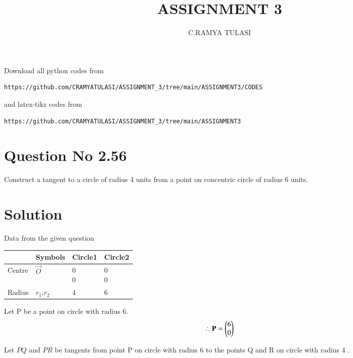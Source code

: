 \documentclass[journal,12pt,twocolumn]{IEEEtran}
\begin{document}
     \def\rightbox#1{\makebox[0in][r]{#1}}
     \def\centbox#1{\makebox[0in]{#1}}
     \def\topbox#1{\raisebox{-\baselineskip}[0in][0in]{#1}}
     \def\midbox#1{\raisebox{-0.5\baselineskip}[0in][0in]{#1}}
\vspace{3cm}
\title{ASSIGNMENT 3}
\author{C.RAMYA TULASI}
\maketitle
\newpage
\bigskip
\renewcommand{\thefigure}{\theenumi}
\renewcommand{\thetable}{\theenumi}
Download all python codes from 
\begin{lstlisting}
https://github.com/CRAMYATULASI/ASSIGNMENT_3/tree/main/ASSIGNMENT3/CODES
\end{lstlisting}
%
and latex-tikz codes from 
%
\begin{lstlisting}
https://github.com/CRAMYATULASI/ASSIGNMENT_3/tree/main/ASSIGNMENT3
\end{lstlisting}
%
\section{Question No 2.56}
Construct a tangent to a circle of radius 4 units from a point on concentric circle of radius 6 units.
%
\section{Solution}
Data from the given question 
\begin{table}[!ht]
\begin{center}
\begin{tabular}{ | m{2cm} | m{1.5cm}| m{2cm} | m{1.5cm} |} 
\hline
& Symbols & Circle1 & Circle2 \\
\hline
Centre & $\vec{O}$ & \myvec{0\\0} & \myvec{0\\0} \\ 
\hline
Radius & $r_{1}$,$r_{2}$ & 4 & 6\\ 
\hline
\end{tabular}
\end{center}
\end{table}

 Let P be a point on circle with radius 6.
\begin{align}
 \therefore \mathbf{P} = \begin{pmatrix}6\\0\end{pmatrix}
\end{align}

Let $PQ$ and $PR$  be tangents from point P on circle with radius 6 to the points Q and R on circle with radius 4 .
\end{document}
